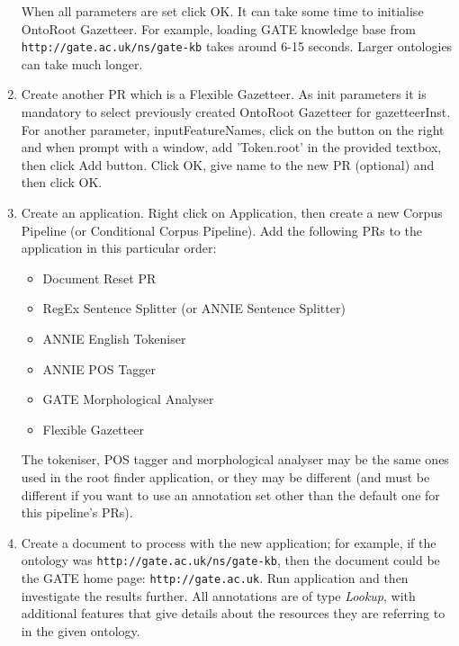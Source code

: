 \begin{enumerate}
When all parameters are set click OK. It can take some time to
initialise OntoRoot Gazetteer. For example, loading GATE knowledge base from
 \texttt{http://gate.ac.uk/ns/gate-kb} takes around 6-15 seconds. Larger
ontologies can take much longer.
 \item Create another PR which is a Flexible Gazetteer. As init parameters
it is
 mandatory to select previously created OntoRoot Gazetteer for gazetteerInst.
 For another parameter, inputFeatureNames, click on the button on the right
 and when prompt with a window, add 'Token.root' in the provided textbox, then
 click Add button. Click OK, give name to the new PR (optional) and then click 
 OK.
\item Create an application. Right click on Application, then create a new
Corpus Pipeline (or Conditional Corpus Pipeline). Add the following PRs to the
application in this particular order:
\begin{itemize}
 \item Document Reset PR
 \item RegEx Sentence Splitter (or ANNIE Sentence Splitter)
 \item ANNIE English Tokeniser
 \item ANNIE POS Tagger
 \item GATE Morphological Analyser
 \item Flexible Gazetteer
\end{itemize}

The tokeniser, POS tagger and morphological analyser may be the same ones used
in the root finder application, or they may be different (and must be different
if you want to use an annotation set other than the default one for this
pipeline's PRs).

\item Create a document to process with the new
application; for example, if the ontology was
\texttt{http://gate.ac.uk/ns/gate-kb}, then the document could be the GATE home
page: \texttt{http://gate.ac.uk}. Run application and then investigate the
results further.
All annotations are of type \emph{Lookup}, with additional features that give
details
about the resources they are referring to in the given ontology.
\end{enumerate}


